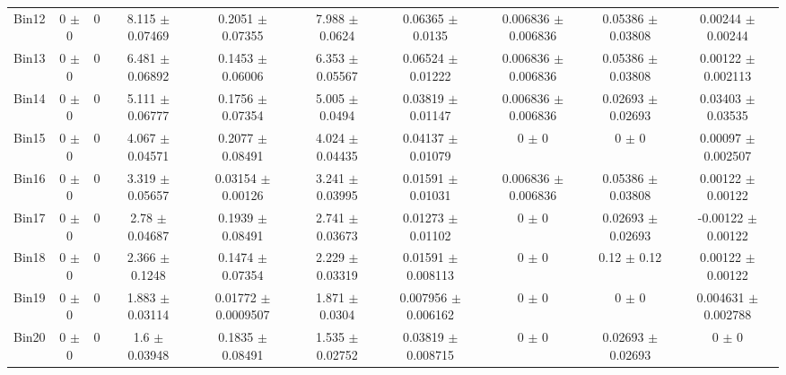 \begin{tabular}{@{\extracolsep{4pt}}lccccccccc@{}}
     Bin12 & 0 $\pm$ 0 & 0 & 8.115 $\pm$ 0.07469 & 0.2051 $\pm$ 0.07355 & 7.988 $\pm$ 0.0624 & 0.06365 $\pm$ 0.0135 & 0.006836 $\pm$ 0.006836 & 0.05386 $\pm$ 0.03808 & 0.00244 $\pm$ 0.00244 \\ 
     Bin13 & 0 $\pm$ 0 & 0 & 6.481 $\pm$ 0.06892 & 0.1453 $\pm$ 0.06006 & 6.353 $\pm$ 0.05567 & 0.06524 $\pm$ 0.01222 & 0.006836 $\pm$ 0.006836 & 0.05386 $\pm$ 0.03808 & 0.00122 $\pm$ 0.002113 \\ 
     Bin14 & 0 $\pm$ 0 & 0 & 5.111 $\pm$ 0.06777 & 0.1756 $\pm$ 0.07354 & 5.005 $\pm$ 0.0494 & 0.03819 $\pm$ 0.01147 & 0.006836 $\pm$ 0.006836 & 0.02693 $\pm$ 0.02693 & 0.03403 $\pm$ 0.03535 \\ 
     Bin15 & 0 $\pm$ 0 & 0 & 4.067 $\pm$ 0.04571 & 0.2077 $\pm$ 0.08491 & 4.024 $\pm$ 0.04435 & 0.04137 $\pm$ 0.01079 & 0 $\pm$ 0 & 0 $\pm$ 0 & 0.00097 $\pm$ 0.002507 \\ 
     Bin16 & 0 $\pm$ 0 & 0 & 3.319 $\pm$ 0.05657 & 0.03154 $\pm$ 0.00126 & 3.241 $\pm$ 0.03995 & 0.01591 $\pm$ 0.01031 & 0.006836 $\pm$ 0.006836 & 0.05386 $\pm$ 0.03808 & 0.00122 $\pm$ 0.00122 \\ 
     Bin17 & 0 $\pm$ 0 & 0 & 2.78 $\pm$ 0.04687 & 0.1939 $\pm$ 0.08491 & 2.741 $\pm$ 0.03673 & 0.01273 $\pm$ 0.01102 & 0 $\pm$ 0 & 0.02693 $\pm$ 0.02693 & -0.00122 $\pm$ 0.00122 \\ 
     Bin18 & 0 $\pm$ 0 & 0 & 2.366 $\pm$ 0.1248 & 0.1474 $\pm$ 0.07354 & 2.229 $\pm$ 0.03319 & 0.01591 $\pm$ 0.008113 & 0 $\pm$ 0 & 0.12 $\pm$ 0.12 & 0.00122 $\pm$ 0.00122 \\ 
     Bin19 & 0 $\pm$ 0 & 0 & 1.883 $\pm$ 0.03114 & 0.01772 $\pm$ 0.0009507 & 1.871 $\pm$ 0.0304 & 0.007956 $\pm$ 0.006162 & 0 $\pm$ 0 & 0 $\pm$ 0 & 0.004631 $\pm$ 0.002788 \\ 
     Bin20 & 0 $\pm$ 0 & 0 & 1.6 $\pm$ 0.03948 & 0.1835 $\pm$ 0.08491 & 1.535 $\pm$ 0.02752 & 0.03819 $\pm$ 0.008715 & 0 $\pm$ 0 & 0.02693 $\pm$ 0.02693 & 0 $\pm$ 0 \\ 
\hline\hline
  \end{tabular}
